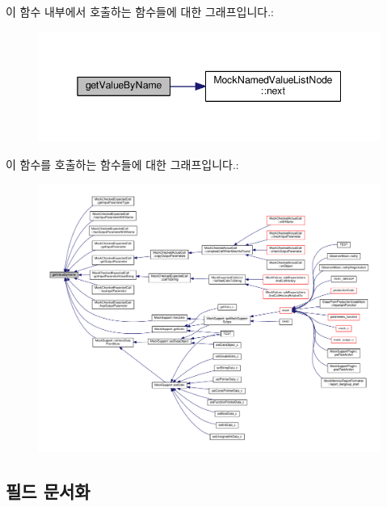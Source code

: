 이 함수 내부에서 호출하는 함수들에 대한 그래프입니다.\+:
\nopagebreak
\begin{figure}[H]
\begin{center}
\leavevmode
\includegraphics[width=345pt]{class_mock_named_value_list_aa38eeec8da4bf05087e65e24cab62437_cgraph}
\end{center}
\end{figure}




이 함수를 호출하는 함수들에 대한 그래프입니다.\+:
\nopagebreak
\begin{figure}[H]
\begin{center}
\leavevmode
\includegraphics[width=350pt]{class_mock_named_value_list_aa38eeec8da4bf05087e65e24cab62437_icgraph}
\end{center}
\end{figure}




\subsection{필드 문서화}
